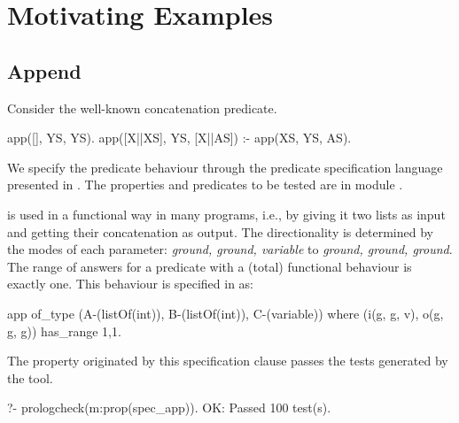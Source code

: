 

\section{Motivating Examples}
\label{sec:motiv-ex}


\subsection{Append}
Consider the well-known concatenation predicate.
%
\begin{yapcode}
 app([], YS, YS).
 app([X||XS], YS, [X||AS]) :- app(XS, YS, AS).
\end{yapcode}
%
We specify the predicate behaviour through the predicate
specification language presented in .
%
The properties and predicates to be tested are in module .
%



 is used in a functional way in many programs,
i.e., by giving it two lists as input and getting their concatenation as
output.
%
The directionality is determined by the modes of each
parameter: \emph{ground, ground, variable} to \emph{ground, ground, ground}.
%
The range of answers for a predicate with a (total) functional
behaviour is exactly one.
%
This behaviour is specified in \plqc{} as:
\begin{yapcode}
 app of_type (A-(listOf(int)), B-(listOf(int)), C-(variable))
   where (i(g, g, v), o(g, g, g))  has_range {1,1}.
\end{yapcode}
%
The property originated by this specification clause passes the tests
generated by the tool.
%
\begin{yapcode}
   ?- prologcheck(m:prop(spec_app)).
 OK: Passed 100 test(s).
\end{yapcode}




